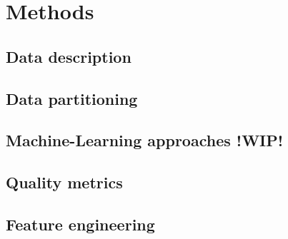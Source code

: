 \chapter{Methods}
\label{cha:Methods}


\section{Data description}



\section{Data partitioning}


\section{Machine-Learning approaches !WIP!}


\section{Quality metrics}


\section{Feature engineering}
